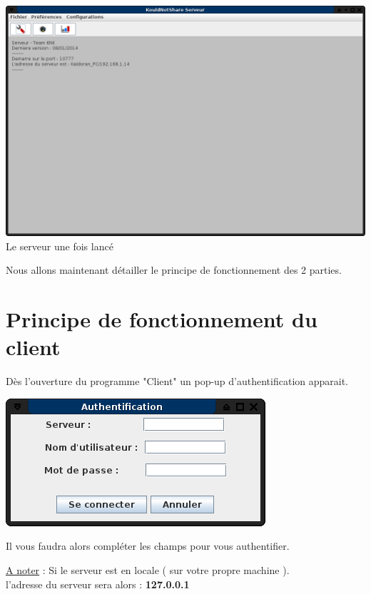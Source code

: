 \documentclass[12pt,a4paper]{article}
\begin{document}
\begin{center}
\includegraphics[scale=0.3]{images/serveurlance.png} \\
Le serveur une fois lancé
\end{center}

Nous allons maintenant détailler le principe de fonctionnement des 2 parties.

\newpage
\section{Principe de fonctionnement du client}

Dès l'ouverture du programme "Client" un pop-up d'authentification apparait.

\begin{center}
\includegraphics[scale=0.5]{images/clientlancelogin.png}
\end{center}

Il vous faudra alors compléter les champs pour vous authentifier.

\underline{A noter} : Si le serveur est en locale ( sur votre propre machine ). \\
l'adresse du serveur sera alors : \textbf{127.0.0.1} \\
\end{document}
